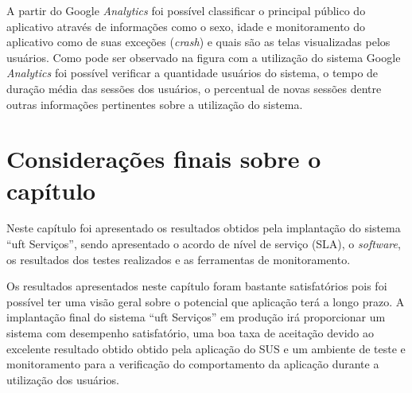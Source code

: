 A partir do Google \textit{Analytics} foi possível classificar o principal público do aplicativo através de informações como o sexo, idade e monitoramento do aplicativo como de suas exceções (\textit{crash}) e quais são as telas visualizadas pelos usuários. Como pode ser observado na figura com a utilização do sistema Google \textit{Analytics} foi possível verificar a quantidade usuários do sistema, o tempo de duração média das sessões dos usuários, o percentual de novas sessões dentre outras informações pertinentes sobre a utilização do sistema.

\section*{Considerações finais sobre o capítulo}

\noindent Neste capítulo foi apresentado os resultados obtidos pela implantação do sistema ``\acrshort{uft} Serviços'', sendo apresentado o acordo de nível de serviço (SLA), o \textit{software}, os resultados dos testes realizados e as ferramentas de monitoramento.

Os resultados apresentados neste capítulo foram bastante satisfatórios pois foi possível ter uma visão geral sobre o potencial que aplicação terá a longo prazo. A implantação final do sistema ``\acrshort{uft} Serviços'' em produção irá proporcionar um sistema com desempenho satisfatório, uma boa taxa de aceitação devido ao excelente resultado obtido obtido pela aplicação do SUS e um ambiente de teste e monitoramento para a verificação do comportamento da aplicação durante a utilização dos usuários.
